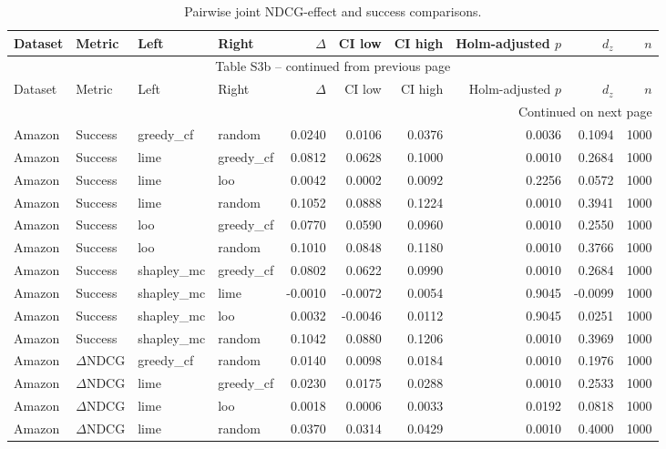 \begin{longtable}{@{}p{.12\linewidth}p{.18\linewidth}p{.13\linewidth}p{.13\linewidth}rrrrrr@{}}
\caption{Pairwise joint NDCG-effect and success comparisons.}\label{tab:S3b}\\
\toprule
Dataset & Metric & Left & Right & $\Delta$ & CI low & CI high & Holm-adjusted $p$ & $d_z$ & $n$ \\
\midrule
\endfirsthead
\multicolumn{10}{c}{Table S3b -- continued from previous page}\\
\toprule
Dataset & Metric & Left & Right & $\Delta$ & CI low & CI high & Holm-adjusted $p$ & $d_z$ & $n$ \\
\midrule
\endhead
\midrule
\multicolumn{10}{r}{Continued on next page}\\
\endfoot
\bottomrule
\endlastfoot
Amazon & Success & greedy\_cf & random & 0.0240 & 0.0106 & 0.0376 & 0.0036 & 0.1094 & 1000 \\
Amazon & Success & lime & greedy\_cf & 0.0812 & 0.0628 & 0.1000 & 0.0010 & 0.2684 & 1000 \\
Amazon & Success & lime & loo & 0.0042 & 0.0002 & 0.0092 & 0.2256 & 0.0572 & 1000 \\
Amazon & Success & lime & random & 0.1052 & 0.0888 & 0.1224 & 0.0010 & 0.3941 & 1000 \\
Amazon & Success & loo & greedy\_cf & 0.0770 & 0.0590 & 0.0960 & 0.0010 & 0.2550 & 1000 \\
Amazon & Success & loo & random & 0.1010 & 0.0848 & 0.1180 & 0.0010 & 0.3766 & 1000 \\
Amazon & Success & shapley\_mc & greedy\_cf & 0.0802 & 0.0622 & 0.0990 & 0.0010 & 0.2684 & 1000 \\
Amazon & Success & shapley\_mc & lime & -0.0010 & -0.0072 & 0.0054 & 0.9045 & -0.0099 & 1000 \\
Amazon & Success & shapley\_mc & loo & 0.0032 & -0.0046 & 0.0112 & 0.9045 & 0.0251 & 1000 \\
Amazon & Success & shapley\_mc & random & 0.1042 & 0.0880 & 0.1206 & 0.0010 & 0.3969 & 1000 \\
Amazon & $\Delta$NDCG & greedy\_cf & random & 0.0140 & 0.0098 & 0.0184 & 0.0010 & 0.1976 & 1000 \\
Amazon & $\Delta$NDCG & lime & greedy\_cf & 0.0230 & 0.0175 & 0.0288 & 0.0010 & 0.2533 & 1000 \\
Amazon & $\Delta$NDCG & lime & loo & 0.0018 & 0.0006 & 0.0033 & 0.0192 & 0.0818 & 1000 \\
Amazon & $\Delta$NDCG & lime & random & 0.0370 & 0.0314 & 0.0429 & 0.0010 & 0.4000 & 1000 \\

\end{longtable}
